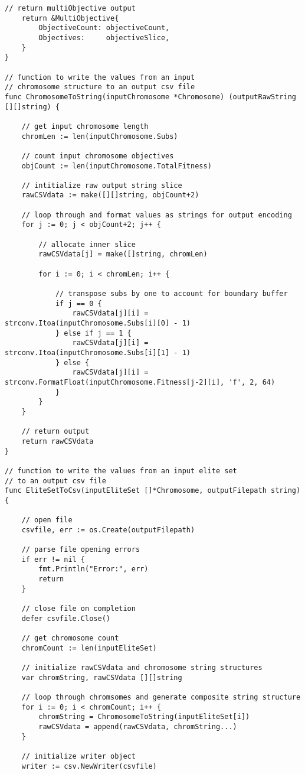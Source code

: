 \begin{lstlisting}[basicstyle=\tiny]
	// return multiObjective output
	return &MultiObjective{
		ObjectiveCount: objectiveCount,
		Objectives:     objectiveSlice,
	}
}

// function to write the values from an input
// chromosome structure to an output csv file
func ChromosomeToString(inputChromosome *Chromosome) (outputRawString [][]string) {

	// get input chromosome length
	chromLen := len(inputChromosome.Subs)

	// count input chromosome objectives
	objCount := len(inputChromosome.TotalFitness)

	// intitialize raw output string slice
	rawCSVdata := make([][]string, objCount+2)

	// loop through and format values as strings for output encoding
	for j := 0; j < objCount+2; j++ {

		// allocate inner slice
		rawCSVdata[j] = make([]string, chromLen)

		for i := 0; i < chromLen; i++ {

			// transpose subs by one to account for boundary buffer
			if j == 0 {
				rawCSVdata[j][i] = strconv.Itoa(inputChromosome.Subs[i][0] - 1)
			} else if j == 1 {
				rawCSVdata[j][i] = strconv.Itoa(inputChromosome.Subs[i][1] - 1)
			} else {
				rawCSVdata[j][i] = strconv.FormatFloat(inputChromosome.Fitness[j-2][i], 'f', 2, 64)
			}
		}
	}

	// return output
	return rawCSVdata
}

// function to write the values from an input elite set
// to an output csv file
func EliteSetToCsv(inputEliteSet []*Chromosome, outputFilepath string) {

	// open file
	csvfile, err := os.Create(outputFilepath)

	// parse file opening errors
	if err != nil {
		fmt.Println("Error:", err)
		return
	}

	// close file on completion
	defer csvfile.Close()

	// get chromosome count
	chromCount := len(inputEliteSet)

	// initialize rawCSVdata and chromosome string structures
	var chromString, rawCSVdata [][]string

	// loop through chromsomes and generate composite string structure
	for i := 0; i < chromCount; i++ {
		chromString = ChromosomeToString(inputEliteSet[i])
		rawCSVdata = append(rawCSVdata, chromString...)
	}

	// initialize writer object
	writer := csv.NewWriter(csvfile)


\end{lstlisting}
